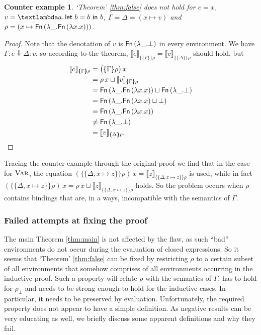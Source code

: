 \documentclass{jfp1}
\newtheorem{counterexample}[theorem]{Counter example}
\theoremstyle{nonumberbreak}
\newtheorem{proof}{Proof}
\newcommand{\sFn}[1]{\text{\textsf{Fn}}\,(#1)}
\newcommand{\sLam}[2]{\text{\textlambda} #1.\, #2}
\newcommand{\sLet}[2]{\text{\textsf{let}}\ #1\ \text{\textsf{in}}\ #2}
\newcommand{\sred}[4]{#1 : #2 \Downarrow #3 : #4}
\newcommand{\sRule}[1]{\text{{\textsc{#1}}}}
\newcommand{\dsem}[2]{\llbracket #1 \rrbracket_{#2}}
\newcommand{\esem}[1]{\{\!\!\!\{#1\}\!\!\!\}}
\begin{document}
\begin{counterexample}
`Theorem' \ref{thm:false} does not hold for $e = x$, $v = \sLam{a}{\sLet{b = b}b}$, $\Gamma = \Delta = (x \mapsto v)$ and $\rho = (x \mapsto \sFn{\lambda \_. \sFn{\lambda x.x}})$. 
\end{counterexample}

\begin{proof}
Note that the denotation of $v$ is $\sFn{\lambda \_. \bot}$ in every environment. We have $\sred\Gamma e\Delta v$, so according to the theorem, $\dsem{e}{\esem{\Gamma}{\rho}} = \dsem{v}{\esem{\Delta}{\rho}}$ should hold, but
\begin{align*}
\dsem{e}{\esem\Gamma\rho}
&= \big(\esem \Gamma\rho\big)\,x \\
&= \rho\,x \sqcup \dsem{v}{\esem{\Gamma}\rho}\\
&= \sFn{\lambda \_. \sFn{\lambda x.x}} \sqcup \sFn{\lambda \_. \bot} \\
&= \sFn{\lambda \_. \sFn{\lambda x.x} \sqcup \bot} \\
&= \sFn{\lambda \_. \sFn{\lambda x.x}} \\
& \ne \sFn{\lambda \_. \bot} \\
&= \dsem{v}{\esem{\Delta}{\rho}}.
\end{align*}
\end{proof}

Tracing the counter example through the original proof we find that in the case for $\sRule{Var}$, the equation $({\esem{\Delta, x\mapsto z}\rho})\, x = \dsem{z}{\esem{\Delta, x\mapsto z}\rho}$ is used, while in fact $({\esem{\Delta, x\mapsto z}\rho})\, x = \rho\, x \sqcup \dsem{z}{\esem{\Delta, x\mapsto z}\rho}$ holds. So the problem occurs when $\rho$ contains bindings that are, in a ways, incompatible with the semantics of $\Gamma$.

\subsubsection{Failed attempts at fixing the proof}

The main Theorem \ref{thm:main} is not affected by the flaw, as such “bad” environments do not occur during the evaluation of closed expressions. So it seems that `Theorem' \ref{thm:false} can be fixed by restricting $\rho$ to a certain subset of all environments that somehow comprises of all environments occurring in the inductive proof. Such a property will relate $\rho$ with the semantics of $\Gamma$, has to hold for $\rho_\bot$ and needs to be strong enough to hold for the inductive cases. In particular, it needs to be preserved by evaluation. Unfortunately, the required property does not appear to have a simple definition. As negative results can be very educating as well, we briefly discuss some apparent definitions and why they fail.
\end{document}
